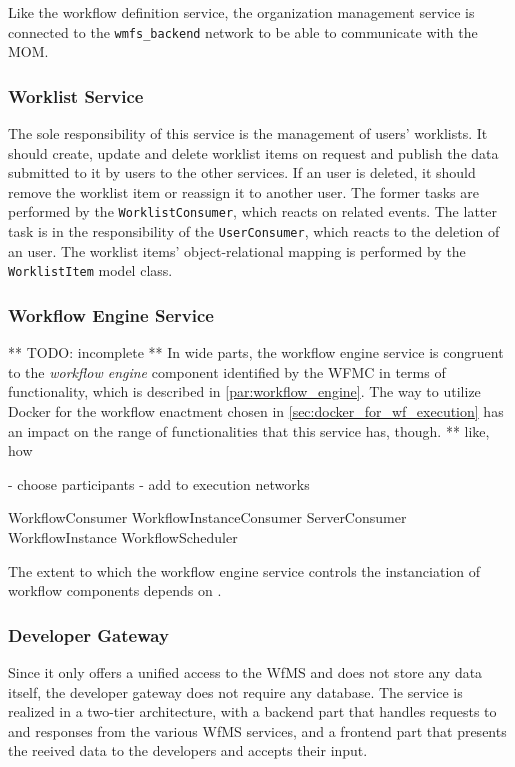    Like the workflow definition service, the organization management service is connected to the \texttt{wmfs\_backend} network to be able to communicate with the \ac{MOM}.

  \subsubsection{Worklist Service} %
    \label{subs:worklist_service}
    The sole responsibility of this service is the management of users' worklists. It should create, update and delete worklist items on request and publish the data submitted to it by users to the other services. If an user is deleted, it should remove the worklist item or reassign it to another user. The former tasks are performed by the \texttt{WorklistConsumer}, which reacts on related events. The latter task is in the responsibility of the \texttt{UserConsumer}, which reacts to the deletion of an user. The worklist items' object-relational mapping is performed by the \texttt{WorklistItem} model class.

  \subsubsection{Workflow Engine Service} %
    \label{subs:workflow_engine_service}
    ** TODO: incomplete **
    In wide parts, the workflow engine service is congruent to the \emph{workflow engine} component identified by the \ac{WFMC} in terms of functionality, which is described in \ref{par:workflow_engine}. The way to utilize Docker for the workflow enactment chosen in \ref{sec:docker_for_wf_execution} has an impact on the range of functionalities that this service has, though. ** like, how

    - choose participants
    - add to execution networks

    WorkflowConsumer
    WorkflowInstanceConsumer
    ServerConsumer
    WorkflowInstance
    WorkflowScheduler


    The extent to which the workflow engine service controls the instanciation of workflow components depends on .

  \subsubsection{Developer Gateway} %
    \label{subs:developer_gateway}
    Since it only offers a unified access to the \ac{WfMS} and does not store any data itself, the developer gateway does not require any database. The service is realized in a two-tier architecture, with a backend part that handles requests to and responses from the various \ac{WfMS} services, and a frontend part that presents the reeived data to the developers and accepts their input.

